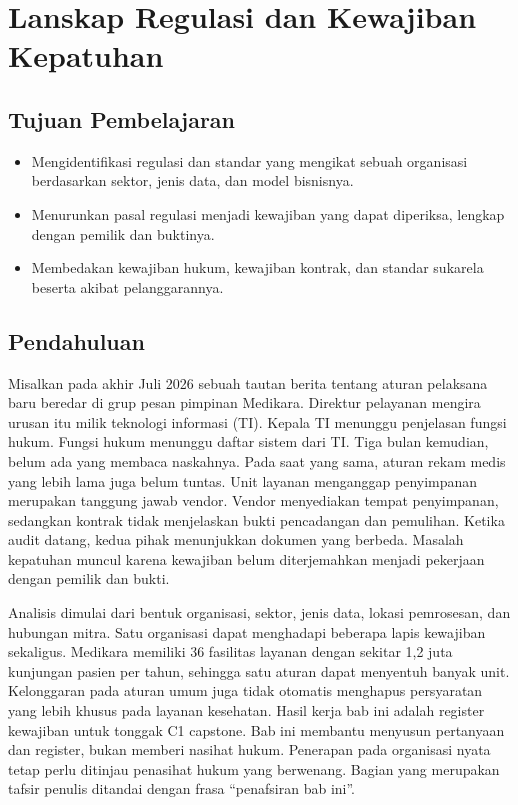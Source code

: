 \chapter{Lanskap Regulasi dan Kewajiban Kepatuhan}

\section*{Tujuan Pembelajaran}
\begin{itemize}
  \item Mengidentifikasi regulasi dan standar yang mengikat sebuah organisasi
  berdasarkan sektor, jenis data, dan model bisnisnya.
  \item Menurunkan pasal regulasi menjadi kewajiban yang dapat diperiksa, lengkap dengan
  pemilik dan buktinya.
  \item Membedakan kewajiban hukum, kewajiban kontrak, dan standar sukarela beserta
  akibat pelanggarannya.
\end{itemize}

\section{Pendahuluan}

Misalkan pada akhir Juli 2026 sebuah tautan berita tentang aturan pelaksana baru beredar di
grup pesan pimpinan Medikara. Direktur pelayanan mengira urusan itu milik teknologi informasi
(TI). Kepala TI menunggu penjelasan fungsi hukum. Fungsi hukum menunggu daftar sistem dari TI.
Tiga bulan kemudian, belum ada yang membaca naskahnya. Pada saat yang sama, aturan rekam medis
yang lebih lama juga belum tuntas. Unit layanan menganggap penyimpanan merupakan tanggung jawab
vendor. Vendor menyediakan tempat penyimpanan, sedangkan kontrak tidak menjelaskan bukti
pencadangan dan pemulihan. Ketika audit datang, kedua pihak menunjukkan dokumen yang berbeda.
Masalah kepatuhan muncul karena kewajiban belum diterjemahkan menjadi pekerjaan dengan pemilik
dan bukti.

Analisis dimulai dari bentuk organisasi, sektor, jenis data, lokasi pemrosesan, dan hubungan
mitra. Satu organisasi dapat menghadapi beberapa lapis kewajiban sekaligus. Medikara memiliki
36 fasilitas layanan dengan sekitar 1,2 juta kunjungan pasien per tahun, sehingga satu aturan
dapat menyentuh banyak unit. Kelonggaran pada aturan umum juga tidak otomatis menghapus
persyaratan yang lebih khusus pada layanan kesehatan. Hasil kerja bab ini adalah register
kewajiban untuk tonggak C1 capstone. Bab ini membantu menyusun pertanyaan dan register, bukan
memberi nasihat hukum. Penerapan pada organisasi nyata tetap perlu ditinjau penasihat hukum
yang berwenang. Bagian yang merupakan tafsir penulis ditandai dengan frasa ``penafsiran bab
ini''.

